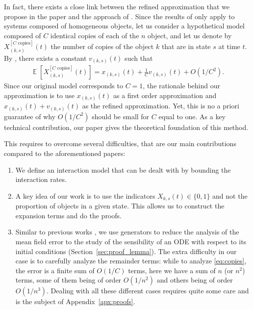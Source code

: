 \documentclass[acmsmall]{acmart}
\newcommand{\ncopies}{^{[C\text{ copies}]}}
\DeclareMathOperator{\E}{\mathbb{E}} %
\newcommand\esp[1]{\E\left[#1\right]} %
\begin{document}
In fact, there exists a close link between the refined approximation that we propose in the paper and the approach of \cite{gastSizeExpansionsMean2019,gastRefinedMeanField2017}. Since the results of \cite{gastSizeExpansionsMean2019,gastRefinedMeanField2017} only apply to systems composed of homogeneous objects, let us consider a hypothetical model composed of $C$ identical copies of each of the $n$ object, and let us denote by $X_{(k,s)}\ncopies(t)$ the number of copies of the object $k$ that are in state $s$ at time $t$. By \cite{gastSizeExpansionsMean2019,gastRefinedMeanField2017}, there exists a constant $v_{(k,s)}(t)$ such that 
\begin{align}
  \label{eq:copies}
  \esp{X_{(k,s)}\ncopies(t)} = x_{(k,s)}(t) + \frac1C v_{(k,s)}(t) + O(1/C^2).
\end{align}
Since our original model corresponds to $C=1$, the rationale behind our approximation is to use $x_{(k,s)}(t)$ as a first order approximation and $x_{(k,s)}(t) + v_{(k,s)}(t)$ as the refined approximation. Yet, this is no a priori guarantee of why $O(1/C^2)$ should be small for $C$ equal to one. As a key technical contribution, our paper gives the theoretical foundation of this method. 
{\color{myorange}
This requires to overcome several difficulties, that are our main contributions compared to the aforementioned papers:
\begin{enumerate}%
  \item We define an interaction model that can be dealt with by bounding the interaction rates. 
  \item A key idea of our work is to use the indicators $X_{k,s}(t)\in\{0,1\}$ and not the proportion of objects in a given state. This allows us to construct the expansion terms and do the proofs.
  \item Similar to previous works \cite{gast2017expected,kolokoltsovMeanFieldGames2012,ying2015rate}, we use generators to reduce the analysis of the mean field error to the study of the sensibility of an ODE with respect to its initial conditions (Section~\ref{sec:proof_lemma}). The extra difficulty in our case is to carefully analyze the remainder terms: while to analyze \eqref{eq:copies}, the error is a finite sum of $O(1/C)$ terms, here we have a sum of $n$ (or $n^2$) terms, some of them being of order $O(1/n^2)$ and others being of order $O(1/n^3)$. Dealing with all these different cases requires quite some care and is the subject of Appendix~\ref{apx:proofs}.
\end{enumerate}
}
\end{document}
